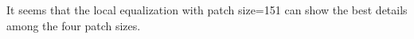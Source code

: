 \documentclass{article}
\begin{document}
It seems that the local equalization with patch size=151 can 
show the best details among the four patch sizes. 

%  


	
\end{document}
